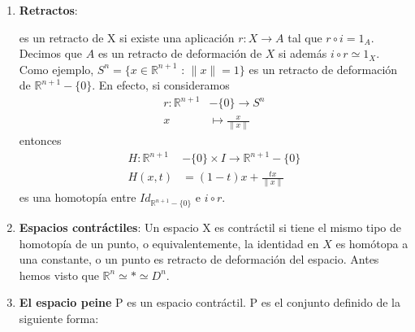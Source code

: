 \begin{ejems}
\begin{enumerate}
\item \label{ej3:ret} \textbf{Retractos}: 
es un retracto de X si existe una aplicación $r : X \longrightarrow A$ tal que $r \circ i = 1_A$.
Decimos que $A$ es un retracto de deformación de $X$ si además $i \circ r \simeq 1_X$.\\
Como ejemplo, $S^n = \{ x \in \mathbb{R}^{n+1}$ : $\| x \| = 1 \}$ es un retracto de deformación de $\mathbb{R}^{n+1} -\{ 0 \}$. En efecto, si consideramos 
\begin{align*}
r : \mathbb{R}^{n+1} &-\{ 0 \} \longrightarrow S^n \\
x &\longmapsto \frac{x}{\| x \|}
\end{align*}
entonces 
\begin{align*}
H : \mathbb{R}^{n+1} &-\{ 0 \} \times I \longrightarrow \mathbb{R}^{n+1} -\{ 0 \} \\
H(x, t) &= (1 - t)x + \frac{tx}{\| x \|} 
\end{align*}
es una homotopía entre $Id_{\mathbb{R}^{n+1} -\{ 0 \}}$ e $i \circ r$.

\item \label{ej3:contr} \textbf{Espacios contráctiles}: Un espacio X es contráctil si tiene el mismo tipo de homotopía de un punto, o equivalentemente, la identidad en $X$ es homótopa a una constante, o un punto es retracto de deformación del espacio. Antes hemos visto que $\mathbb{R}^n \simeq \ast \simeq D^n $.

\item \label{ej3:peine} \textbf{El espacio peine} P es un espacio contráctil. P es el conjunto definido de la siguiente forma: 


\end{enumerate}
\end{ejems}
